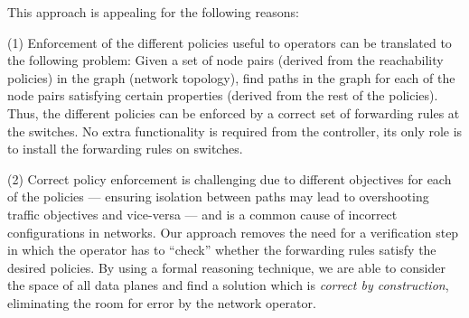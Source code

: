 This approach is appealing for the following reasons: 

(1)
Enforcement of the different policies useful to operators 
can be translated to 
the following problem: Given a set of node pairs 
(derived from the reachability policies) in the graph 
(network topology), find paths in the graph for each
of the node pairs satisfying certain properties (derived
from the rest of the policies). 
Thus, the different policies can be enforced by 
a correct set of forwarding rules at the switches. 
No extra functionality is required from the controller,
its only role is to install the forwarding rules on switches.



(2) Correct policy enforcement is challenging due to different
objectives for each of the policies --- ensuring isolation between
paths may lead to overshooting traffic objectives and vice-versa ---
and is a common cause of incorrect configurations in networks.  Our
approach removes the need for a verification step in which the
operator has to ``check'' whether the forwarding rules satisfy the
desired policies.  By using a formal reasoning technique, we are able
to consider the space of all data planes and find a solution which is
\emph{correct by construction}, eliminating the room for error by the
network operator.

